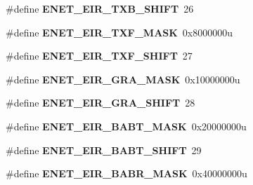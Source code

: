 \begin{DoxyCompactItemize}
\item 
\#define {\bfseries E\+N\+E\+T\+\_\+\+E\+I\+R\+\_\+\+T\+X\+B\+\_\+\+S\+H\+I\+FT}~26\hypertarget{group__ENET__Register__Masks_gaa855bd984448a54af78d55584c066594}{}\label{group__ENET__Register__Masks_gaa855bd984448a54af78d55584c066594}

\item 
\#define {\bfseries E\+N\+E\+T\+\_\+\+E\+I\+R\+\_\+\+T\+X\+F\+\_\+\+M\+A\+SK}~0x8000000u\hypertarget{group__ENET__Register__Masks_ga06433ca8a67a5460754fe9b2074d8520}{}\label{group__ENET__Register__Masks_ga06433ca8a67a5460754fe9b2074d8520}

\item 
\#define {\bfseries E\+N\+E\+T\+\_\+\+E\+I\+R\+\_\+\+T\+X\+F\+\_\+\+S\+H\+I\+FT}~27\hypertarget{group__ENET__Register__Masks_gaefe127d672dddef700ffb0f0cac33df7}{}\label{group__ENET__Register__Masks_gaefe127d672dddef700ffb0f0cac33df7}

\item 
\#define {\bfseries E\+N\+E\+T\+\_\+\+E\+I\+R\+\_\+\+G\+R\+A\+\_\+\+M\+A\+SK}~0x10000000u\hypertarget{group__ENET__Register__Masks_ga172383b70c089716b68b3ffa7c6a5cd9}{}\label{group__ENET__Register__Masks_ga172383b70c089716b68b3ffa7c6a5cd9}

\item 
\#define {\bfseries E\+N\+E\+T\+\_\+\+E\+I\+R\+\_\+\+G\+R\+A\+\_\+\+S\+H\+I\+FT}~28\hypertarget{group__ENET__Register__Masks_gaaf2ca77536e8dbd47979124db1d4cb3c}{}\label{group__ENET__Register__Masks_gaaf2ca77536e8dbd47979124db1d4cb3c}

\item 
\#define {\bfseries E\+N\+E\+T\+\_\+\+E\+I\+R\+\_\+\+B\+A\+B\+T\+\_\+\+M\+A\+SK}~0x20000000u\hypertarget{group__ENET__Register__Masks_ga2ee6dd7628d551b9a94c482a567d21fa}{}\label{group__ENET__Register__Masks_ga2ee6dd7628d551b9a94c482a567d21fa}

\item 
\#define {\bfseries E\+N\+E\+T\+\_\+\+E\+I\+R\+\_\+\+B\+A\+B\+T\+\_\+\+S\+H\+I\+FT}~29\hypertarget{group__ENET__Register__Masks_ga316dbe501e294bfeedecda20bb81cdc6}{}\label{group__ENET__Register__Masks_ga316dbe501e294bfeedecda20bb81cdc6}

\item 
\#define {\bfseries E\+N\+E\+T\+\_\+\+E\+I\+R\+\_\+\+B\+A\+B\+R\+\_\+\+M\+A\+SK}~0x40000000u\hypertarget{group__ENET__Register__Masks_gaa0d5f950cb5b2252eda9744944f88f17}{}\label{group__ENET__Register__Masks_gaa0d5f950cb5b2252eda9744944f88f17}


\end{DoxyCompactItemize}
